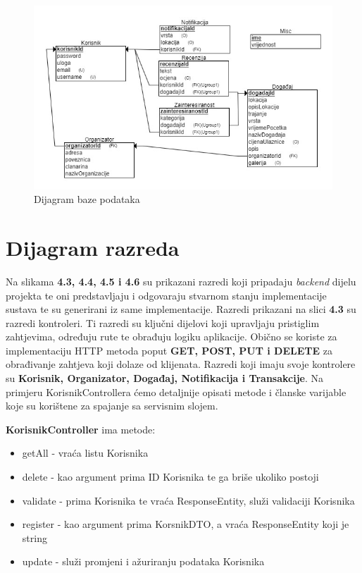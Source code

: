 				
					\begin{figure}[H]
					\includegraphics[scale=0.9]{slike/baza.png} %
					\centering
					\caption{Dijagram baze podataka}
					\label{fig:promjene}
				\end{figure}
				\eject	
				
			
			
		\section{Dijagram razreda}
		
			Na slikama \textbf{4.3, 4.4, 4.5 i 4.6} su prikazani razredi koji pripadaju \textit{backend} dijelu projekta te oni predstavljaju i odgovaraju stvarnom stanju implementacije sustava te su generirani iz same implementacije. 
			\newline
			\newline
			Razredi prikazani na slici \textbf{4.3} su razredi kontroleri. Ti razredi su ključni dijelovi koji upravljaju pristiglim zahtjevima, određuju rute te obrađuju logiku aplikacije. Obično se koriste za implementaciju HTTP metoda poput \textbf{GET, POST, PUT i DELETE} za obrađivanje zahtjeva koji dolaze od klijenata. Razredi koji imaju svoje kontrolere su \textbf{Korisnik, Organizator,  Događaj, Notifikacija i Transakcije}. Na primjeru KorisnikControllera ćemo detaljnije opisati metode i članske varijable koje su korištene za spajanje sa servisnim slojem.
			\newline
			
			\textbf{KorisnikController} ima metode: 
			\begin{itemize}
				\item getAll - vraća listu Korisnika
				\item delete - kao argument prima ID Korisnika te ga briše ukoliko postoji
				\item validate - prima Korisnika te vraća ResponseEntity, služi validaciji Korisnika
				\item register - kao argument prima KorsnikDTO, a vraća ResponseEntity koji je string
				\item update - služi promjeni i ažuriranju podataka Korisnika
			\end{itemize}
			

